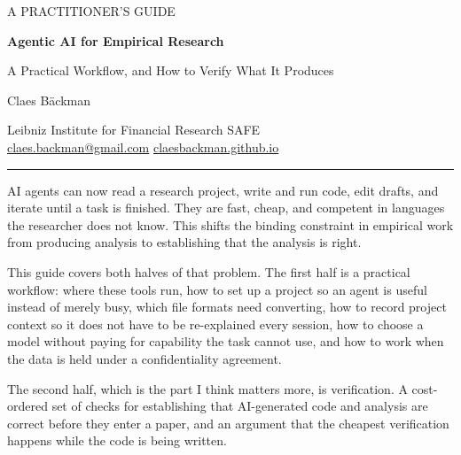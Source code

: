 \documentclass[11pt,a4paper]{article}
\begin{document}
\begin{titlepage}
\thispagestyle{empty}
\vspace*{2.2cm}

{\color{mutedink}\footnotesize\sffamily A PRACTITIONER'S GUIDE}

\vspace{0.7cm}
{\huge\bfseries\color{ink} Agentic AI for Empirical Research\par}

\vspace{0.45cm}
{\LARGE\color{accent} A Practical Workflow, and How to Verify What It Produces\par}

\vspace{1.2cm}
{\large Claes Bäckman\par}
\vspace{0.25cm}
{\small\color{mutedink}
Leibniz Institute for Financial Research SAFE\\[2pt]
\href{mailto:claes.backman@gmail.com}{claes.backman@gmail.com} \textbullet{}
\href{https://claesbackman.github.io/}{claesbackman.github.io}\par}

\vspace{1.4cm}
{\color{mutedink}\rule{4cm}{1pt}}

\vspace{1.0cm}
\noindent\begin{minipage}{0.92\textwidth}
\small
\setlength{\parskip}{0.7em}
\setlength{\parindent}{0pt}
AI agents can now read a research project, write and run code, edit drafts, and
iterate until a task is finished. They are fast, cheap, and competent in
languages the researcher does not know. This shifts the binding constraint in
empirical work from producing analysis to establishing that the analysis is
right.

This guide covers both halves of that problem. The first half is a practical
workflow: where these tools run, how to set up a project so an agent is useful
instead of merely busy, which file formats need converting, how to record
project context so it does not have to be re-explained every session, how to
choose a model without paying for capability the task cannot use, and how to
work when the data is held under a confidentiality agreement.

The second half, which is the part I think matters more, is verification. A
cost-ordered set of checks for establishing that AI-generated code and analysis
are correct before they enter a paper, and an argument that the cheapest
verification happens while the code is being written.


\end{minipage}
\end{titlepage}
\end{document}
